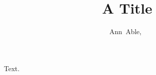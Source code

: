\documentclass[journal]{IEEEtran}
\begin{document}
\IEEEpeerreviewmaketitle
\title{A Title}
\author{Ann~Able,~}
\maketitle
Text.
\end{document}
